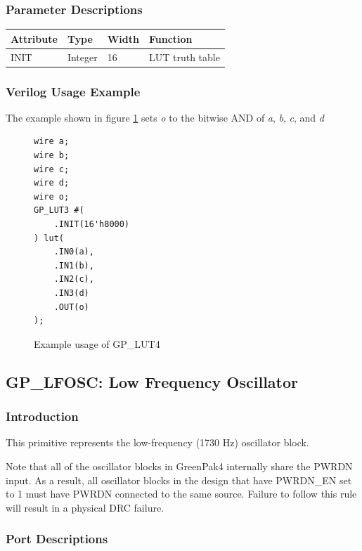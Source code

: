 \documentclass{article}
\begin{document}
\subsubsection{Parameter Descriptions}

\begin{tabularx}{4in}{|l|l|l|X|}
\hline
{\bfseries Attribute} & {\bfseries Type} & {\bfseries Width} & {\bfseries Function} \\
\hline
INIT & Integer & 16 & LUT truth table \\
\hline
\end{tabularx}

\subsubsection{Verilog Usage Example}

The example shown in figure \ref{gp-lut4-example} sets \emph{o} to the bitwise AND of \emph{a}, \emph{b}, \emph{c},
and \emph{d}

\begin{figure}[h]
\begin{lstlisting}
wire a;
wire b;
wire c;
wire d;
wire o;
GP_LUT3 #(
	.INIT(16'h8000)
) lut(
	.IN0(a),
	.IN1(b),
	.IN2(c),
	.IN3(d)
	.OUT(o)
);
\end{lstlisting}
\caption{Example usage of GP\_LUT4}
\label{gp-lut4-example}
\end{figure}


\pagebreak
\subsection{GP\_LFOSC: Low Frequency Oscillator}

\subsubsection{Introduction}
This primitive represents the low-frequency (1730 Hz) oscillator block.

Note that all of the oscillator blocks in GreenPak4 internally share the PWRDN input. As a result, all oscillator 
blocks in the design that have PWRDN\_EN set to 1 must have PWRDN connected to the same source. Failure to follow this 
rule will result in a physical DRC failure.

\subsubsection{Port Descriptions}
\end{document}
